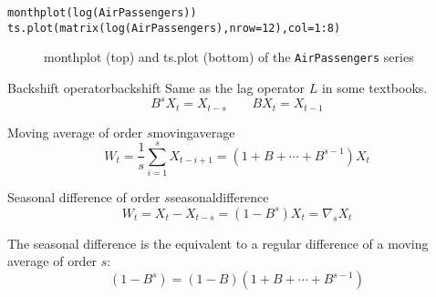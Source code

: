 \begin{verbatim}
monthplot(log(AirPassengers))
ts.plot(matrix(log(AirPassengers),nrow=12),col=1:8)
\end{verbatim}

\begin{figure}[H]
	\caption{monthplot (top) and ts.plot (bottom) of the \texttt{AirPassengers} series}
\end{figure}

\begin{definition}{Backshift operator}{backshift}
    Same as the lag operator $L$ in some textbooks.
    \begin{equation}
        B^s X_t = X_{t-s} \qquad BX_t = X_{t-1}
    \end{equation}
\end{definition}

\begin{definition}{Moving average of order $s$}{movingaverage}
    \begin{equation}
        W_t = \frac{1}{s} \sum_{i=1}^s X_{t-i+1} = (1 + B + \cdots + B^{s-1}) X_t
    \end{equation}
\end{definition}

\begin{definition}{Seasonal difference of order $s$}{seasonaldifference}
    \begin{equation}
        W_t = X_t - X_{t-s} = (1 - B^s) X_t = \nabla_s X_t
    \end{equation}
    \tcblower
    \begin{note}
        The seasonal difference is the equivalent to a regular difference of a
        moving average of order $s$:
        \begin{equation}
            (1 - B^s) = (1 - B) (1 + B + \cdots + B^{s-1})
        \end{equation}
    \end{note}
\end{definition}

